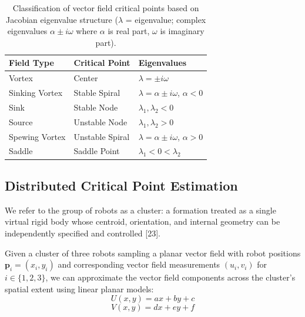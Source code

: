 \documentclass[lettersize,journal]{IEEEtran}
\begin{document}
\begin{table}[!t]
    \centering
    \caption{Classification of vector field critical points based on Jacobian eigenvalue structure ($\lambda$ = eigenvalue; complex eigenvalues $\alpha \pm i\omega$ where $\alpha$ is real part, $\omega$ is imaginary part).}
    \label{tab:field_summary}
    \begin{tabular}{lll}
    \hline
    \textbf{Field Type} & \textbf{Critical Point} & \textbf{Eigenvalues} \\
    \hline
    Vortex & Center & $\lambda = \pm i\omega$ \\
    Sinking Vortex & Stable Spiral & $\lambda = \alpha \pm i\omega$, $\alpha < 0$ \\
    Sink & Stable Node & $\lambda_1, \lambda_2 < 0$ \\
    Source & Unstable Node & $\lambda_1, \lambda_2 > 0$ \\
    Spewing Vortex & Unstable Spiral & $\lambda = \alpha \pm i\omega$, $\alpha > 0$ \\
    Saddle & Saddle Point & $\lambda_1 < 0 < \lambda_2$ \\
    \hline
    \end{tabular}
\end{table}


\subsection{Distributed Critical Point Estimation}
\noindent

We refer to the group of robots as a cluster: a formation treated as a single virtual rigid body whose centroid, orientation, and internal geometry can be independently specified and controlled [23].

Given a cluster of three robots sampling a planar vector field with robot positions $\mathbf{p}_i = (x_i, y_i)$ and corresponding vector field measurements $(u_i, v_i)$ for $i \in \{1, 2, 3\}$, we can approximate the vector field components across the cluster's spatial extent using linear planar models:
\begin{equation}
U(x,y) = ax + by + c
\end{equation}
\begin{equation}
V(x,y) = dx + ey + f
\end{equation}
\end{document}
